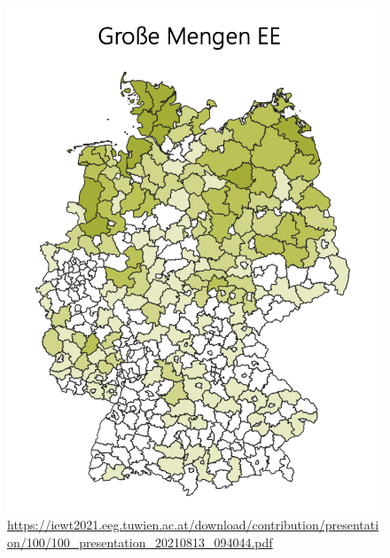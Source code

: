 \documentclass[aspectratio=169,t]{beamer}
\begin{document}
\begin{frame}
\begin{minipage}{1\linewidth}
\begin{minipage}{.5\linewidth}
\begin{itemize}
		\end{itemize}
	\end{minipage}
\hfill
\begin{minipage}{.5\linewidth}
\centering
\vspace*{-0.6cm}
\begin{figure}
	\includegraphics[width=.7\linewidth]{renewable.png}
	\vspace*{-0.25cm}
	\caption[]{\small\url{https://iewt2021.eeg.tuwien.ac.at/download/contribution/presentation/100/100_presentation_20210813_094044.pdf}}
\end{figure}

\end{minipage}
\end{minipage}	
		
			
		
	\end{frame}
\end{document}

